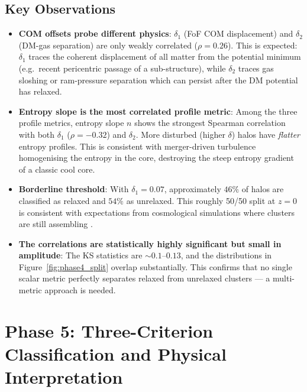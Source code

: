 \documentclass[12pt,a4paper]{article}
\begin{document}
\subsection{Key Observations}

\begin{itemize}
  \item \textbf{COM offsets probe different physics}: $\delta_1$ (FoF COM displacement)
        and $\delta_2$ (DM-gas separation) are only weakly correlated ($\rho = 0.26$).
        This is expected: $\delta_1$ traces the coherent displacement of all matter
        from the potential minimum (e.g.\ recent pericentric passage of a sub-structure),
        while $\delta_2$ traces gas sloshing or ram-pressure separation which can persist
        after the DM potential has relaxed.

  \item \textbf{Entropy slope is the most correlated profile metric}: Among the three
        profile metrics, entropy slope $n$ shows the strongest Spearman correlation
        with both $\delta_1$ ($\rho = -0.32$) and $\delta_2$. More disturbed (higher
        $\delta$) halos have \emph{flatter} entropy profiles.  This is consistent with
        merger-driven turbulence homogenising the entropy in the core, destroying the
        steep entropy gradient of a classic cool core.

  \item \textbf{Borderline threshold}: With $\delta_1 = 0.07$, approximately $46\%$
        of halos are classified as relaxed and $54\%$ as unrelaxed. This roughly
        50/50 split at $z=0$ is consistent with expectations from cosmological simulations
        where clusters are still assembling \citep{biffi2016}.

  \item \textbf{The correlations are statistically highly significant but small in
        amplitude}: The KS statistics are $\sim 0.1$--$0.13$, and the distributions
        in Figure~\ref{fig:phase4_split} overlap substantially. This confirms that
        no single scalar metric perfectly separates relaxed from unrelaxed clusters ---
        a multi-metric approach is needed.
\end{itemize}

\section{Phase 5: Three-Criterion Classification and Physical Interpretation}
\label{sec:phase5}
\end{document}
